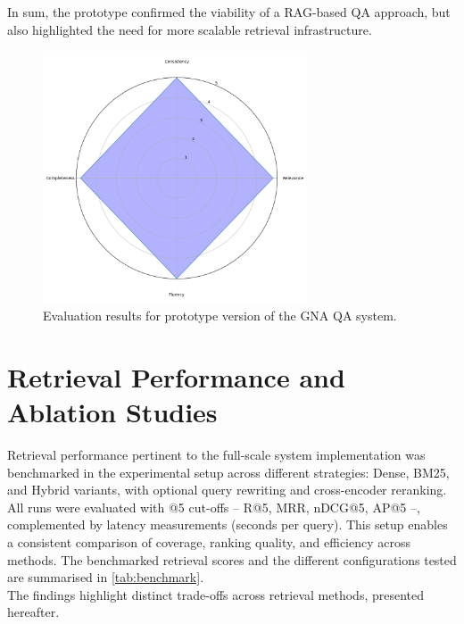 \begin{spacing}{1.5}
In sum, the prototype confirmed the viability of a RAG-based QA approach, but also highlighted the need for more scalable retrieval infrastructure.

\begin{figure}[H]
  \centering
  \includegraphics[width=0.7\textwidth]{images/radar.png} 
  \caption{Evaluation results for prototype version of the GNA QA system.}
  \label{fig:proto_results}
\end{figure}


\section{Retrieval Performance and Ablation Studies}\label{sec:retrieval_ablation}
Retrieval performance pertinent to the full-scale system implementation was benchmarked in the experimental setup across different strategies: Dense, BM25, and Hybrid variants, with optional query rewriting and cross-encoder reranking. All runs were evaluated with @5 cut-offs -- R@5, MRR, nDCG@5, AP@5 --, complemented by latency measurements (seconds per query). This setup enables a consistent comparison of coverage, ranking quality, and efficiency across methods. The benchmarked retrieval scores and the different configurations tested are summarised in \autoref{tab:benchmark}.\\

\noindent The findings highlight distinct trade-offs across retrieval methods, presented hereafter.\\


\end{spacing}
